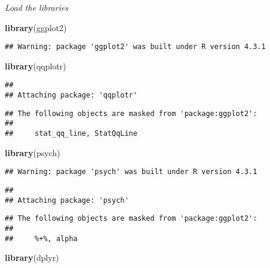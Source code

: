 \documentclass[
]{article}
\author{}
\date{\vspace{-2.5em}}
\newenvironment{Shaded}{\begin{snugshade}}{\end{snugshade}}
\newcommand{\FunctionTok}[1]{\textcolor[rgb]{0.13,0.29,0.53}{\textbf{#1}}}
\newcommand{\NormalTok}[1]{#1}
\begin{document}
\emph{Load the libraries}

\begin{Shaded}
\begin{Highlighting}[]
\FunctionTok{library}\NormalTok{(ggplot2)}
\end{Highlighting}
\end{Shaded}

\begin{verbatim}
## Warning: package 'ggplot2' was built under R version 4.3.1
\end{verbatim}

\begin{Shaded}
\begin{Highlighting}[]
\FunctionTok{library}\NormalTok{(qqplotr)}
\end{Highlighting}
\end{Shaded}

\begin{verbatim}
## 
## Attaching package: 'qqplotr'
\end{verbatim}

\begin{verbatim}
## The following objects are masked from 'package:ggplot2':
## 
##     stat_qq_line, StatQqLine
\end{verbatim}

\begin{Shaded}
\begin{Highlighting}[]
\FunctionTok{library}\NormalTok{(psych)}
\end{Highlighting}
\end{Shaded}

\begin{verbatim}
## Warning: package 'psych' was built under R version 4.3.1
\end{verbatim}

\begin{verbatim}
## 
## Attaching package: 'psych'
\end{verbatim}

\begin{verbatim}
## The following objects are masked from 'package:ggplot2':
## 
##     %+%, alpha
\end{verbatim}

\begin{Shaded}
\begin{Highlighting}[]
\FunctionTok{library}\NormalTok{(dplyr)}
\end{Highlighting}
\end{Shaded}
\end{document}
